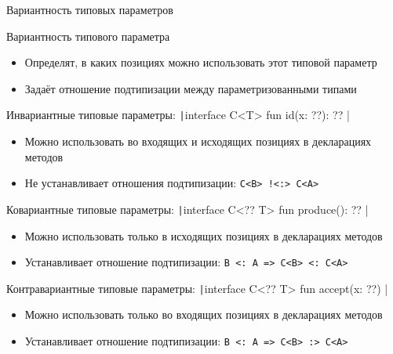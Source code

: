 \documentclass[handout,aspectratio=169,usenames,dvipsnames]{beamer}
\begin{document}
\begin{frame}[fragile]{Вариантность типовых параметров}
    \begin{block}{Вариантность типового параметра}
        \begin{itemize}
            \item Определят, в каких позициях можно использовать этот типовой параметр
            \item Задаёт отношение подтипизации между параметризованными типами
        \end{itemize}
    \end{block}

    \pause
    \begin{block}{Инвариантные типовые параметры: \texttt|interface C<T> { fun id(x: ??): ?? }|}
        \begin{itemize}
            \item Можно использовать во входящих и исходящих позициях в декларациях методов
            \item Не устанавливает отношения подтипизации: \texttt{C<B> !<:> C<A>}
        \end{itemize}
    \end{block}

    \pause
    \begin{block}{Ковариантные типовые параметры: \texttt|interface C<?? T> { fun produce(): ?? }|}
        \begin{itemize}
            \item Можно использовать только в исходящих позициях в декларациях методов
            \item Устанавливает отношение подтипизации: \texttt{B <: A => C<B> <: C<A>}
        \end{itemize}
    \end{block}

    \pause
    \begin{block}{Контравариантные типовые параметры: \texttt|interface C<?? T> { fun accept(x: ??) }|}
        \begin{itemize}
            \item Можно использовать только во входящих позициях в декларациях методов
            \item Устанавливает отношение подтипизации: \texttt{B <: A => C<B> :> C<A>}
        \end{itemize}
    \end{block}
\end{frame}
\end{document}
